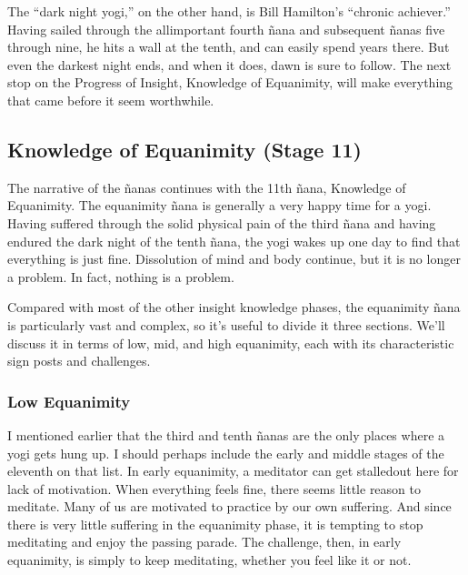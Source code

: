 \documentclass[a5paper,10pt,english]{book}
\begin{document}
\sphinxAtStartPar
The “dark night yogi,” on the other hand, is Bill Hamilton’s “chronic
achiever.” Having sailed through the all\sphinxhyphen{}important fourth ñana and
subsequent ñanas five through nine, he hits a wall at the tenth, and can
easily spend years there. But even the darkest night ends, and when it
does, dawn is sure to follow. The next stop on the Progress of Insight,
Knowledge of Equanimity, will make everything that came before it seem
worthwhile.


\subsection{Knowledge of Equanimity (Stage 11)}
\label{\detokenize{main-2:knowledge-of-equanimity-stage-11}}
\sphinxAtStartPar
The narrative of the ñanas continues with the 11th ñana, Knowledge of
Equanimity. The equanimity ñana is generally a very happy time for a
yogi. Having suffered through the solid physical pain of the third ñana
and having endured the dark night of the tenth ñana, the yogi wakes up
one day to find that everything is just fine. Dissolution of mind and
body continue, but it is no longer a problem. In fact, nothing is a
problem.

\sphinxAtStartPar
Compared with most of the other insight knowledge phases, the equanimity
ñana is particularly vast and complex, so it’s useful to divide it three
sections. We’ll discuss it in terms of low, mid, and high equanimity,
each with its characteristic sign posts and challenges.


\subsubsection{Low Equanimity}
\label{\detokenize{main-2:low-equanimity}}
\sphinxAtStartPar
I mentioned earlier that the third and tenth ñanas are the only places
where a yogi gets hung up. I should perhaps include the early and middle
stages of the eleventh on that list. In early equanimity, a meditator
can get stalled\sphinxhyphen{}out here for lack of motivation. When everything feels
fine, there seems little reason to meditate. Many of us are motivated to
practice by our own suffering. And since there is very little suffering
in the equanimity phase, it is tempting to stop meditating and enjoy the
passing parade. The challenge, then, in early equanimity, is simply to
keep meditating, whether you feel like it or not.
\end{document}
